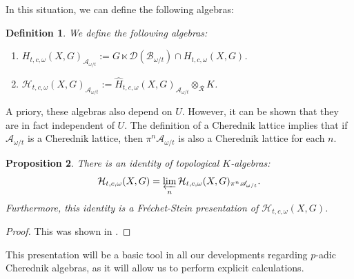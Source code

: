 \documentclass{amsart}
\newtheorem{defi}{ Definition}[subsection]
\newtheorem{prop}[defi]{ Proposition}
\begin{document}
In this situation, we can define the following algebras:
\begin{defi}
    We define the following algebras:
\begin{enumerate}[label=(\roman*)]
\item $H_{t,c,\omega}(X,G)_{\mathscr{A}_{\omega/t}} :=G\ltimes \mathcal{D}(\mathscr{B}_{\omega/t})\cap H_{t,c,\omega}(X,G)$.
\item $\mathcal{H}_{t,c,\omega}(X,G)_{\mathscr{A}_{\omega/t}}:=\widehat{H}_{t,c,\omega}(X,G)_{\mathscr{A}_{\omega/t}}\otimes_{\mathcal{R}}K$.  
\end{enumerate}
\end{defi}
A priory, these algebras also depend on $U$. However, it can be shown that they are in fact independent of $U$. The definition of a Cherednik lattice implies that if $\mathscr{A}_{\omega/t}$ is a Cherednik lattice, then $\pi^n\mathscr{A}_{\omega/t}$ is also a Cherednik lattice for each $n$. 
\begin{prop}
There is an identity of topological $K$-algebras:
\begin{equation*}
    \mathcal{H}_{t,c,\omega}(X,G)=\varprojlim_n\mathcal{H}_{t,c,\omega}(X,G)_{\pi^n\mathscr{A}_{\omega/t}}.
\end{equation*}
Furthermore, this identity is a Fréchet-Stein presentation of $\mathcal{H}_{t,c,\omega}(X,G)$.
\end{prop}
\begin{proof}
This was shown in \cite[Section 4.3]{p-adicCheralg}.
\end{proof}
This presentation will be a basic tool in all our developments regarding $p$-adic Cherednik algebras, as it will allow us to perform explicit calculations.
\end{document}
